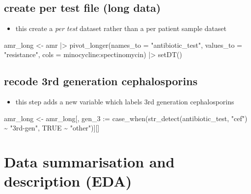 \documentclass[
  letterpaper,
  DIV=11,
  numbers=noendperiod]{scrreprt}
\newenvironment{Shaded}{\begin{snugshade}}{\end{snugshade}}
\newcommand{\AttributeTok}[1]{\textcolor[rgb]{0.40,0.45,0.13}{#1}}
\newcommand{\ConstantTok}[1]{\textcolor[rgb]{0.56,0.35,0.01}{#1}}
\newcommand{\ErrorTok}[1]{\textcolor[rgb]{0.68,0.00,0.00}{#1}}
\newcommand{\FunctionTok}[1]{\textcolor[rgb]{0.28,0.35,0.67}{#1}}
\newcommand{\NormalTok}[1]{\textcolor[rgb]{0.00,0.23,0.31}{#1}}
\newcommand{\OtherTok}[1]{\textcolor[rgb]{0.00,0.23,0.31}{#1}}
\newcommand{\SpecialCharTok}[1]{\textcolor[rgb]{0.37,0.37,0.37}{#1}}
\newcommand{\StringTok}[1]{\textcolor[rgb]{0.13,0.47,0.30}{#1}}
\providecommand{\tightlist}{%
  \setlength{\itemsep}{0pt}\setlength{\parskip}{0pt}}\usepackage{longtable,booktabs,array}
\begin{document}
\subsection{create per test file (long
data)}\label{create-per-test-file-long-data}

\begin{itemize}
\tightlist
\item
  this create a \emph{per test} dataset rather than a per patient sample
  dataset
\end{itemize}

\begin{Shaded}
\begin{Highlighting}[]
\NormalTok{amr\_long }\OtherTok{\textless{}{-}}\NormalTok{ amr }\SpecialCharTok{|\textgreater{}}
    \FunctionTok{pivot\_longer}\NormalTok{(}\AttributeTok{names\_to =} \StringTok{"antibiotic\_test"}\NormalTok{, }\AttributeTok{values\_to =} \StringTok{"resistance"}\NormalTok{, }\AttributeTok{cols =}\NormalTok{ minocycline}\SpecialCharTok{:}\NormalTok{spectinomycin) }\SpecialCharTok{|\textgreater{}} \FunctionTok{setDT}\NormalTok{()}
\end{Highlighting}
\end{Shaded}

\subsection{recode 3rd generation
cephalosporins}\label{recode-3rd-generation-cephalosporins}

\begin{itemize}
\tightlist
\item
  this step adds a new variable which labels 3rd generation
  cephalosporins
\end{itemize}

\begin{Shaded}
\begin{Highlighting}[]
\NormalTok{amr\_long }\OtherTok{\textless{}{-}}\NormalTok{ amr\_long[, gen\_3 }\SpecialCharTok{:}\ErrorTok{=} \FunctionTok{case\_when}\NormalTok{(}\FunctionTok{str\_detect}\NormalTok{(antibiotic\_test, }\StringTok{"cef"}\NormalTok{) }\SpecialCharTok{\textasciitilde{}} \StringTok{"3rd{-}gen"}\NormalTok{, }\ConstantTok{TRUE} \SpecialCharTok{\textasciitilde{}} \StringTok{"other"}\NormalTok{)][]}
\end{Highlighting}
\end{Shaded}

\section{Data summarisation and description
(EDA)}\label{data-summarisation-and-description-eda}
\end{document}
